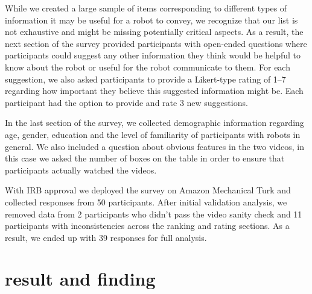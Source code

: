 \documentclass[letterpaper, 10 pt, conference]{ieeeconf}  %
\begin{document}
    While we created a large sample of items corresponding to different types of information it may be useful for a robot to convey, we recognize that our list is not exhaustive and might be missing potentially critical aspects. As a result, the next section of the survey provided participants with open-ended questions where participants could suggest any other information they think would be helpful to know about the robot or useful for the robot communicate to them. For each suggestion, we also asked participants to provide a Likert-type rating of 1--7 regarding how important they believe this suggested information might be. Each participant had the option to provide and rate 3 new suggestions. %

    In the last section of the survey, we collected demographic information regarding age, gender, education and the level of familiarity of participants with robots in general. We also included a question about obvious features in the two videos, in this case we asked the number of boxes on the table in order to ensure that participants actually watched the videos.

    With IRB approval we deployed the survey on Amazon Mechanical Turk and collected responses from 50 participants. After initial validation analysis, we removed data from 2 participants who didn't pass the video sanity check and 11 participants with inconsistencies across the ranking and rating sections. %
    As a result, we ended up with 39 responses for full analysis.

\section{result and finding}
\end{document}
